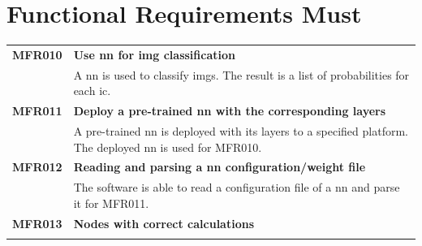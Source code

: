 \documentclass[parskip=full]{scrartcl}
\begin{document}
\section{Functional Requirements Must}
\begin{tabular}{p{2cm}p{12cm}}
\textbf{MFR010} & \textbf{Use \gls{nn} for \gls{img} classification}\\                                     
& A \gls{nn} is used to classify \glspl{img}. The result is a list of probabilities for each \gls{ic}.\\
\textbf{MFR011} & \textbf{Deploy a pre-trained \gls{nn} with the corresponding layers}\\
& A pre-trained \gls{nn} is deployed with its layers to a specified platform. The deployed \gls{nn} is used for MFR010.\\
\textbf{MFR012} & \textbf{Reading and parsing a \gls{nn} configuration/weight file}\\
& The software is able to read a configuration file of a \gls{nn} and parse it for MFR011.\\

\textbf{MFR013} & \textbf{Nodes with correct calculations}\\
& \\


\end{tabular}
\end{document}
